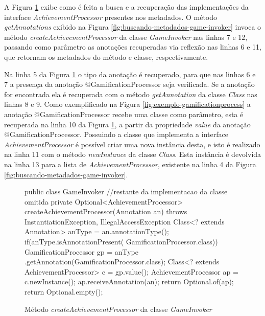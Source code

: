 A Figura \ref{fig:criacao-achievement-processors} exibe como é feita a busca e a recuperação das implementações da interface \textit{AchievementProcessor} presentes nos metadados. O
método \textit{getAnnotations} exibido na Figura \ref{fig:buscando-metadados-game-invoker} invoca o 
método \textit{createAchievementProcessor} da classe \textit{GameInvoker} nas linhas 7 e 12, passando como parâmetro as anotações recuperadas via reflexão nas linhas 6 e 11, que retornam os metadados do método e classe, respectivamente. 

\par Na linha 5 da Figura \ref{fig:criacao-achievement-processors} o tipo da anotação é recuperado, para que nas linhas 6 e 7 a presença da anotação @GamificationProcessor seja verificada. Se a anotação for encontrada ela é recuperada com o método \textit{getAnnotation} da classe \textit{Class} nas linhas 8 e 9. Como exemplificado na Figura \ref{fig:exemplo-gamificationprocess} a anotação @GamificationProcessor recebe uma classe como parâmetro, esta é recuperada na linha 10 da Figura \ref{fig:criacao-achievement-processors}, a partir da propriedade \textit{value} da anotação @GamificationProcessor. Possuindo a classe que implementa a interface \textit{AchievementProcessor} é possível criar uma nova instância desta, e isto é realizado na linha 11 com o método \textit{newInstance} da classe \textit{Class}. Esta instância é devolvida na linha 13 para a lista de \textit{AchievementProcessor}, existente na linha 4 da Figura \ref{fig:buscando-metadados-game-invoker}.

\begin{figure}[H]
    \centering
    \begin{java}
public class GameInvoker{
//restante da implementacao da classe omitida
    private Optional<AchievementProcessor> createAchievementProcessor(Annotation an) throws InstantiationException,
    			IllegalAccessException {
		Class<? extends Annotation> anType = an.annotationType();
		if(anType.isAnnotationPresent(
		    GamificationProcessor.class)){
			GamificationProcessor gp = anType
			.getAnnotation(GamificationProcessor.class);
			Class<? extends AchievementProcessor> c = gp.value();
			AchievementProcessor ap = c.newInstance();				
			ap.receiveAnnotation(an);
			return Optional.of(ap);
		}
		return Optional.empty();
	}
}
    \end{java}
    \caption{Método \textit{createAchievementProcessor} da classe \textit{GameInvoker}}
    \label{fig:criacao-achievement-processors}
\end{figure}

